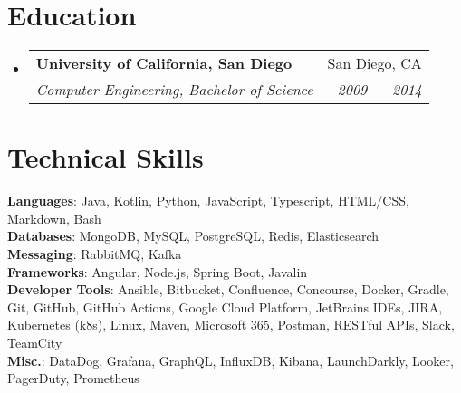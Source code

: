 \documentclass[letterpaper,10pt]{article}
\makeatletter
\newcommand{\eduSubheading}[4]{
  \vspace{-2pt}\item
    \begin{tabular*}{0.97\textwidth}[t]{l@{\extracolsep{\fill}}r}
      \textbf{#1} & #2 \\
      \textit{\small#3} & \textit{\small #4} \\
    \end{tabular*}\vspace{-7pt}
}
\newcommand{\resumeSubHeadingListStart}{\begin{itemize}[leftmargin=0.10in, label={}]}
\newcommand{\resumeSubHeadingListEnd}{\end{itemize}}
\makeatother
\begin{document}
\section{Education}
  \resumeSubHeadingListStart
    \eduSubheading{University of California, San Diego}
      {San Diego, CA}
      {Computer Engineering, Bachelor of Science}
      {2009 --- 2014}
  \resumeSubHeadingListEnd

\section{Technical Skills}
  \begin{itemize}[leftmargin=0.10in, label={}]
    \small{
      \item{
        \textbf{Languages}{: Java, Kotlin, Python, JavaScript, Typescript, HTML/CSS, Markdown, Bash} \\
        \textbf{Databases}{: MongoDB, MySQL, PostgreSQL, Redis, Elasticsearch} \\
        \textbf{Messaging}{: RabbitMQ, Kafka} \\
        \textbf{Frameworks}{: Angular, Node.js, Spring Boot, Javalin} \\
        \textbf{Developer Tools}{: Ansible, Bitbucket, Confluence, Concourse, Docker, Gradle, Git, GitHub, GitHub Actions, Google Cloud Platform, JetBrains IDEs, JIRA, Kubernetes (k8s), Linux, Maven, Microsoft 365, Postman, RESTful APIs, Slack, TeamCity} \\
        \textbf{Misc.}{: DataDog, Grafana, GraphQL, InfluxDB, Kibana, LaunchDarkly, Looker, PagerDuty, Prometheus}
      }
    }
  \end{itemize}
\end{document}

